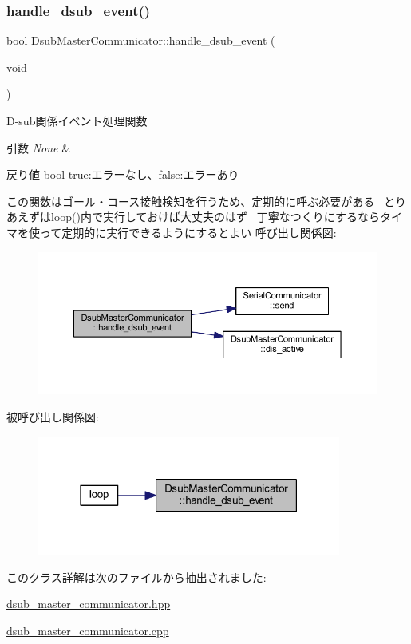 \subsubsection{\texorpdfstring{handle\_dsub\_event()}{handle\_dsub\_event()}}
{\footnotesize\ttfamily bool Dsub\+Master\+Communicator\+::handle\+\_\+dsub\+\_\+event (\begin{DoxyParamCaption}\item[{void}]{ }\end{DoxyParamCaption})}



D-\/sub関係イベント処理関数 


\begin{DoxyParams}{引数}
{\em None} & \\
\hline
\end{DoxyParams}
\begin{DoxyReturn}{戻り値}
bool true\+:エラーなし、false\+:エラーあり
\end{DoxyReturn}
この関数はゴール・コース接触検知を行うため、定期的に呼ぶ必要がある~\newline
とりあえずはloop()内で実行しておけば大丈夫のはず~\newline
丁寧なつくりにするならタイマを使って定期的に実行できるようにするとよい 呼び出し関係図\+:\nopagebreak
\begin{figure}[H]
\begin{center}
\leavevmode
\includegraphics[width=350pt]{class_dsub_master_communicator_a91a5a356d0aa58a30f3381522cd7616f_cgraph}
\end{center}
\end{figure}
被呼び出し関係図\+:\nopagebreak
\begin{figure}[H]
\begin{center}
\leavevmode
\includegraphics[width=283pt]{class_dsub_master_communicator_a91a5a356d0aa58a30f3381522cd7616f_icgraph}
\end{center}
\end{figure}


このクラス詳解は次のファイルから抽出されました\+:\begin{DoxyCompactItemize}
\item 
\mbox{\hyperlink{dsub__master__communicator_8hpp}{dsub\+\_\+master\+\_\+communicator.\+hpp}}\item 
\mbox{\hyperlink{dsub__master__communicator_8cpp}{dsub\+\_\+master\+\_\+communicator.\+cpp}}\end{DoxyCompactItemize}
